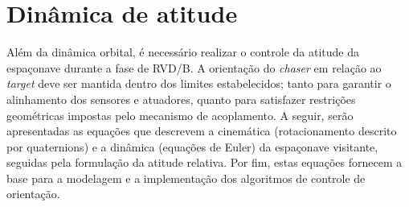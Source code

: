 \section{Dinâmica de atitude}
Além da dinâmica orbital, é necessário realizar o controle da atitude da espaçonave durante a fase de RVD/B. 
A orientação do \emph{chaser} em relação ao \emph{target} deve ser mantida dentro dos limites estabelecidos; tanto para garantir o alinhamento dos sensores e atuadores, quanto para satisfazer restrições geométricas impostas pelo mecanismo de acoplamento.
A seguir, serão apresentadas as equações que descrevem a cinemática (rotacionamento descrito por quaternions) e a dinâmica (equações de Euler) da espaçonave visitante, seguidas pela formulação da atitude relativa.
Por fim, estas equações fornecem a base para a modelagem e a implementação dos algoritmos de controle de orientação.




